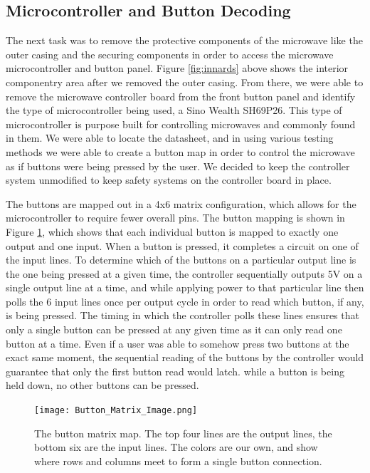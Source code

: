 \documentclass[10pt,journal,letterpaper,twocolumn]{IEEEtran}
\begin{document}
\subsection*{Microcontroller and Button Decoding}

The next task was to remove the protective components of the microwave like the outer casing and the securing components in order to access the microwave microcontroller and button panel.  Figure \ref{fig:innards} above shows the interior componentry area after we removed the outer casing.  From there, we were able to remove the microwave controller board from the front button panel and identify the type of microcontroller being used, a Sino Wealth SH69P26.  This type of microcontroller is purpose built for controlling microwaves and commonly found in them.  We were able to locate the datasheet, and in using various testing methods we were able to create a button map in order to control the microwave as if buttons were being pressed by the user.  We decided to keep the controller system unmodified to keep safety systems on the controller board in place.

The buttons are mapped out in a 4x6 matrix configuration, which allows for the microcontroller to require fewer overall pins.  The button mapping is shown in  Figure \ref{fig:buttonmatrix}, which shows that each individual button is mapped to exactly one output and one input.  When a button is pressed, it completes a circuit on one of the input lines.  To determine which of the buttons on a particular output line is the one being pressed at a given time, the controller sequentially outputs 5V on a single output line at a time, and while applying power to that particular line then polls the 6 input lines once per output cycle in order to read which button, if any, is being pressed.  The timing in which the controller polls these lines ensures that only a single button can be pressed at any given time as it can only read one button at a time.  Even if a user was able to somehow press two buttons at the exact same moment, the sequential reading of the buttons by the controller would guarantee that only the first button read would latch.  while a button is being held down, no other buttons can be pressed.

\begin{figure}[ht]
\centering
\texttt{[image: Button\_Matrix\_Image.png]}
\caption{\label{fig:buttonmatrix}The button matrix map. The top four lines are the output lines, the bottom six are the input lines.  The colors are our own, and show where rows and columns meet to form a single button connection.}
\end{figure}
\end{document}
